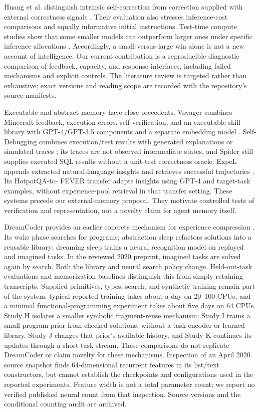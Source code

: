 \documentclass[11pt]{article}
\begin{document}
Huang et al. distinguish intrinsic self-correction from correction supplied
with external correctness signals \cite{huang}. Their evaluation also stresses
inference-cost comparisons and equally informative initial instructions.
Test-time compute studies show that some smaller models can outperform larger
ones under specific inference allocations \cite{snell}. Accordingly, a
small-versus-large win alone is not a new account of intelligence. Our current
contribution is a reproducible diagnostic comparison of feedback, capacity,
and response interfaces, including failed mechanisms and explicit controls.
The literature review is targeted rather than exhaustive; exact versions and
reading scope are recorded with the repository's source manifests.


Executable and abstract memory have close precedents. Voyager combines
Minecraft feedback, execution errors, self-verification, and an executable
skill library with GPT-4/GPT-3.5 components and a separate embedding model
\cite{voyager}. Self-Debugging combines execution/test results with generated
explanations or simulated traces \cite{selfdebug}; its traces are not observed
intermediate states, and Spider still supplies executed SQL results without
a unit-test correctness oracle. ExpeL appends extracted natural-language
insights and retrieves successful trajectories \cite{expel}. Its HotpotQA-to-
FEVER transfer adapts insights using GPT-4 and target-task examples, without
experience-pool retrieval in that transfer setting. These systems precede
our external-memory proposal. They motivate controlled tests of verification
and representation, not a novelty claim for agent memory itself.

DreamCoder provides an earlier concrete mechanism for experience compression
\cite{dreamcoder}. Its wake phase searches for programs; abstraction sleep
refactors solutions into a reusable library; dreaming sleep trains a neural
recognition model on replayed and imagined tasks. In the reviewed 2020
preprint, imagined tasks are solved again by search. Both the library and
neural search policy change. Held-out-task evaluations and memorization
baselines distinguish this from simply retaining transcripts. Supplied
primitives, types, search, and synthetic training remain part of the system:
typical reported training takes about a day on 20--100 CPUs, and a minimal
functional-programming experiment takes about five days on 64 CPUs. Study H
isolates a smaller symbolic fragment-reuse mechanism; Study I trains a small
program prior from checked solutions, without a task encoder or learned
library. Study J changes that prior's available history, and Study K continues its
updates through a short task stream. These comparisons
do not replicate DreamCoder or claim novelty for these mechanisms.
Inspection of an April 2020 source snapshot finds 64-dimensional recurrent
features in its list/text constructors, but cannot establish the checkpoints
and configurations used in the reported experiments. Feature width is not a
total parameter count; we report no verified published neural count from that
inspection. Source versions and the conditional counting audit are archived.
\end{document}
